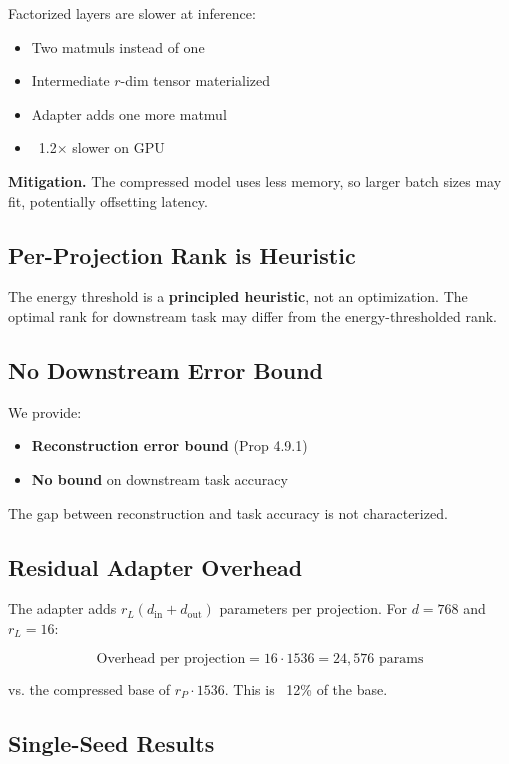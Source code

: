 Factorized layers are slower at inference:
\begin{itemize}
\item Two matmuls instead of one
\item Intermediate $r$-dim tensor materialized
\item Adapter adds one more matmul
\item ~1.2$\times$ slower on GPU

\end{itemize}
\textbf{Mitigation.} The compressed model uses less memory, so larger batch sizes 
may fit, potentially offsetting latency.

\subsection{Per-Projection Rank is Heuristic}

The energy threshold is a \textbf{principled heuristic}, not an optimization. The 
optimal rank for downstream task may differ from the energy-thresholded rank.

\subsection{No Downstream Error Bound}

We provide:
\begin{itemize}
\item \textbf{Reconstruction error bound} (Prop 4.9.1)
\item \textbf{No bound} on downstream task accuracy

\end{itemize}
The gap between reconstruction and task accuracy is not characterized.

\subsection{Residual Adapter Overhead}

The adapter adds $r_L (d_\text{in} + d_\text{out})$ parameters per projection. 
For $d = 768$ and $r_L = 16$:

\[
\text{Overhead per projection} = 16 \cdot 1536 = 24,576 \text{ params}
\]

vs. the compressed base of $r_P \cdot 1536$. This is ~12\% 
of the base.

\subsection{Single-Seed Results}

